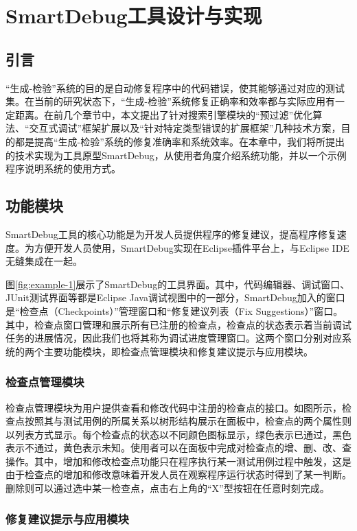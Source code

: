 \chapter{SmartDebug工具设计与实现}
\label{cha:impl}

\section{引言}
“生成-检验”系统的目的是自动修复程序中的代码错误，使其能够通过对应的测试集。在当前的研究状态下，“生成-检验”系统修复正确率和效率都与实际应用有一定距离。在前几个章节中，本文提出了针对搜索引擎模块的“预过滤”优化算法、“交互式调试”框架扩展以及“针对特定类型错误的扩展框架”几种技术方案，目的都是提高“生成-检验”系统的修复准确率和系统效率。在本章中，我们将所提出的技术实现为工具原型SmartDebug，从使用者角度介绍系统功能，并以一个示例程序说明系统的使用方式。

\section{功能模块}
SmartDebug工具的核心功能是为开发人员提供程序的修复建议，提高程序修复速度。为方便开发人员使用，SmartDebug实现在Eclipse插件平台上，与Eclipse IDE无缝集成在一起。

图\ref{fig:example-1}展示了SmartDebug的工具界面。其中，代码编辑器、调试窗口、JUnit测试界面等都是Eclipse Java调试视图中的一部分，SmartDebug加入的窗口是“检查点（Checkpoints）”管理窗口和“修复建议列表（Fix Suggestions）”窗口。其中，检查点窗口管理和展示所有已注册的检查点，检查点的状态表示着当前调试任务的进展情况，因此我们也将其称为调试进度管理窗口。这两个窗口分别对应系统的两个主要功能模块，即检查点管理模块和修复建议提示与应用模块。

\subsection{检查点管理模块}
检查点管理模块为用户提供查看和修改代码中注册的检查点的接口。如图所示，检查点按照其与测试用例的所属关系以树形结构展示在面板中，检查点的两个属性则以列表方式显示。每个检查点的状态以不同颜色图标显示，绿色表示已通过，黑色表示不通过，黄色表示未知。使用者可以在面板中完成对检查点的增、删、改、查操作。其中，增加和修改检查点功能只在程序执行某一测试用例过程中触发，这是由于检查点的增加和修改意味着开发人员在观察程序运行状态时得到了某一判断。删除则可以通过选中某一检查点，点击右上角的“X”型按钮在任意时刻完成。

\subsection{修复建议提示与应用模块}


